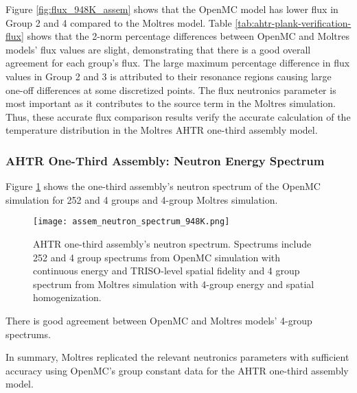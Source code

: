 Figure \ref{fig:flux_948K_assem} shows that the OpenMC model has 
lower flux in Group 2 and 4 compared to the Moltres model. 
Table \ref{tab:ahtr-plank-verification-flux} shows that the 2-norm percentage differences 
between OpenMC and Moltres models' flux values are slight, demonstrating that there is a 
good overall agreement for each group's flux.
The large maximum percentage difference in flux values in Group 2 and 3 is attributed to 
their resonance regions causing large one-off differences at some discretized points.
The flux neutronics parameter is most important as it contributes to the source term in the 
Moltres simulation. Thus, these accurate flux comparison results verify the accurate calculation 
of the temperature distribution in the Moltres \gls{AHTR} one-third assembly model. 

\subsubsection{AHTR One-Third Assembly: Neutron Energy Spectrum}
Figure \ref{fig:assem_neutron_spectrum_948K} shows the one-third assembly's neutron 
spectrum of the OpenMC simulation for 252 and 4 groups and 4-group Moltres 
simulation. 
 \begin{figure}[htbp]
    \centering
    \texttt{[image: assem\_neutron\_spectrum\_948K.png]}
    \caption{\acrfull{AHTR} one-third assembly's neutron spectrum.
    Spectrums include 252 and 4 group spectrums from OpenMC simulation with continuous 
    energy and TRISO-level spatial fidelity and 4 group spectrum from Moltres 
    simulation with 4-group energy and spatial homogenization.}  
    \label{fig:assem_neutron_spectrum_948K}
\end{figure}
There is good agreement between OpenMC and Moltres models' 4-group spectrums. 

In summary, Moltres replicated the relevant neutronics parameters with sufficient 
accuracy using OpenMC's group constant data for the \gls{AHTR} one-third assembly 
model. 

